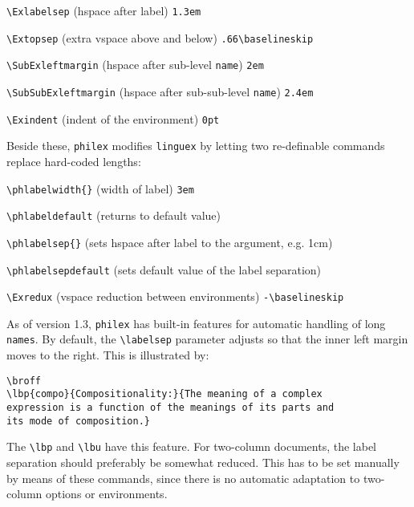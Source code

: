 \documentclass[11pt]{article}
\begin{document}
\begin{trivlist}
\item \verb+\Exlabelsep+ (hspace after label) \hfill  \verb+1.3em+
\item \verb+\Extopsep+ (extra vspace above and below) \hfill \verb+.66\baselineskip+
\item \verb+\SubExleftmargin+ (hspace after sub-level \verb+name+) \hfill \verb+2em+
\item \verb+\SubSubExleftmargin+ (hspace after sub-sub-level \verb+name+) \hfill \verb+2.4em+
\item \verb+\Exindent+ (indent of the environment) \hfill \verb+0pt+
\end{trivlist}
	Beside these, \verb+philex+ modifies \verb+linguex+ by letting two re-definable commands replace hard-coded lengths:
	
\begin{trivlist}
\item \verb+\phlabelwidth{}+ (width of label) \hfill \verb+3em+
\item \verb+\phlabeldefault+ (returns to default value)
\item \verb+\phlabelsep{}+ (sets hspace after label to the argument, e.g. 1cm)
\item \verb+\phlabelsepdefault+ (sets default value of the label separation)
\item \verb+\Exredux+ (vspace reduction between environments) \hfill \verb+-\baselineskip+
\end{trivlist}	

As of version 1.3, \verb+philex+ has built-in features for automatic handling of long \verb+names+. By default, the \verb+\labelsep+ parameter adjusts so that the inner left margin moves to the right. This is illustrated by:  

\begin{verbatim}
\broff
\lbp{compo}{Compositionality:}{The meaning of a complex 
expression is a function of the meanings of its parts and
its mode of composition.}
\end{verbatim}

\broff

% 
\bron%
The \verb+\lbp+ and \verb+\lbu+ have this feature. For two-column documents, the label separation should preferably be somewhat reduced. This has to be set manually by means of these commands, since there  is no automatic adaptation to two-column options or environments.
\end{document}
